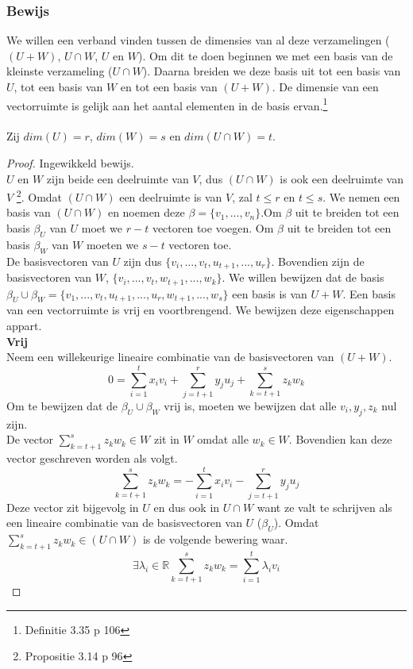 \documentclass[lineaire_algebra_oplossingen.tex]{subfiles}
\begin{document}
\subsubsection*{Bewijs}
We willen een verband vinden tussen de dimensies van al deze verzamelingen ($(U+W)$, $U\cap W$, $U$ en $W$). Om dit te doen beginnen we met een basis van de kleinste verzameling ($U \cap W$). Daarna breiden we deze basis uit tot een basis van $U$, tot een basis van $W$ en tot een basis van $(U + W)$. De dimensie van een vectorruimte is gelijk aan het aantal elementen in de basis ervan.\footnote{Definitie 3.35 p 106}\\\\
Zij $dim(U) = r$, $dim(W)=s$ en $dim(U\cap W) = t$.
\begin{proof}
Ingewikkeld bewijs.\\
$U$ en $W$ zijn beide een deelruimte van $V$, dus $(U \cap W)$ is ook een deelruimte van $V$ \footnote{Propositie 3.14 p 96}. Omdat $(U \cap W)$ een deelruimte is van $V$, zal $t \le r$ en $t \le s$. We nemen een basis van $(U\cap W)$ en noemen deze $\beta = \{v_1,...,v_n\}$.Om $\beta$ uit te breiden tot een basis $\beta_U$ van $U$ moet we $r-t$ vectoren toe voegen. Om $\beta$ uit te breiden tot een basis $\beta_W$ van $W$ moeten we $s-t$ vectoren toe.\\
De basisvectoren van $U$ zijn dus $\{v_i,...,v_t,u_{t+1},...,u_r\}$. Bovendien zijn de basisvectoren van $W$, $\{v_i,...,v_t,w_{t+1},...,w_k\}$.
We willen bewijzen dat de basis $\beta_U \cup \beta_W = \{v_1,...,v_t,u_{t+1},...,u_{r},w_{t+1},...,w_{s}\}$ een basis is van $U+W$.
Een basis van een vectorruimte is vrij en voortbrengend. We bewijzen deze eigenschappen appart.\\
\textbf{Vrij}\\
Neem een willekeurige lineaire combinatie van de basisvectoren van $(U+W)$.
\[
0 = \sum_{i=1}^tx_iv_i + \sum_{j=t+1}^ry_ju_j + \sum_{k=t+1}^sz_kw_k
\]
Om te bewijzen dat de $\beta_U \cup \beta_W$ vrij is, moeten we bewijzen dat alle $v_i,y_j,z_k$ nul zijn.\\
De vector $\sum_{k=t+1}^sz_kw_k \in W$ zit in $W$ omdat alle $w_k \in W$. Bovendien kan deze vector geschreven worden als volgt.
\[
\sum_{k=t+1}^sz_kw_k = -\sum_{i=1}^tx_iv_i - \sum_{j=t+1}^ry_ju_j
\]
Deze vector zit bijgevolg in $U$ en dus ook in $U\cap W$ want ze valt te schrijven als een lineaire combinatie van de basisvectoren van $U$ ($\beta_U$).
Omdat $\sum_{k=t+1}^sz_kw_k \in (U\cap W)$ is de volgende bewering waar.
\[
\exists \lambda_i \in \mathbb{R} \sum_{k=t+1}^sz_kw_k = \sum_{i=1}^t\lambda_iv_i
\]
\end{proof}
\end{document}
